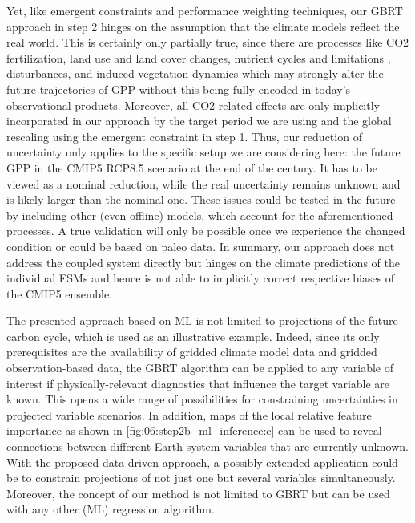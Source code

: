 Yet, like emergent constraints and performance weighting techniques, our
\ac{GBRT} approach in step 2 hinges on the assumption that the climate models
reflect the real world. This is certainly only partially true, since there are
processes like \ac{CO2} fertilization, land use and land cover changes,
nutrient cycles and limitations \autocite{Du2020,Fleischer2019}, disturbances,
and induced vegetation dynamics which may strongly alter the future
trajectories of \ac{GPP} without this being fully encoded in today's
observational products. Moreover, all \ac{CO2}-related effects are only
implicitly incorporated in our approach by the target period we are using and
the global rescaling using the emergent constraint in step 1. Thus, our
reduction of uncertainty only applies to the specific setup we are considering
here: the future \ac{GPP} in the \acs{CMIP}5 \acs{RCP}8.5 scenario at the end
of the  century. It has to be viewed as a nominal reduction, while the
real uncertainty remains unknown and is likely larger than the nominal one.
These issues could be tested in the future by including other (even offline)
models, which account for the aforementioned processes. A true validation will
only be possible once we experience the changed condition or could be based on
paleo data. In summary, our approach does not address the coupled system
directly but hinges on the climate predictions of the individual \acp{ESM} and
hence is not able to implicitly correct respective biases of the \acs{CMIP}5
ensemble.

The presented approach based on \ac{ML} is not limited to projections of the
future carbon cycle, which is used as an illustrative example. Indeed, since
its only prerequisites are the availability of gridded climate model data and
gridded observation-based data, the \ac{GBRT} algorithm can be applied to any
variable of interest if physically-relevant diagnostics that influence the
target variable are known. This opens a wide range of possibilities for
constraining uncertainties in projected variable scenarios. In addition, maps
of the local relative feature importance as shown in
\cref{fig:06:step2b_ml_inference:c} can be used to reveal connections between
different Earth system variables that are currently unknown. With the proposed
data-driven approach, a possibly extended application could be to constrain
projections of not just one but several variables simultaneously. Moreover, the
concept of our method is not limited to \ac{GBRT} but can be used with any
other (\ac{ML}) regression algorithm.

